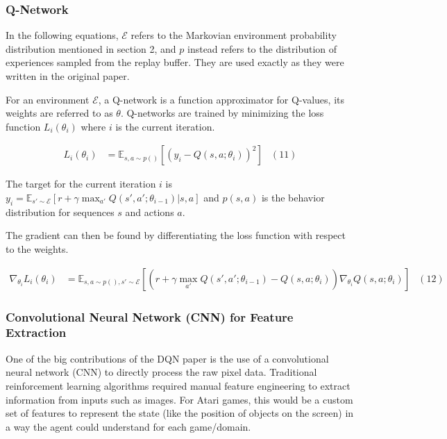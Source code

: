\documentclass{article}
\begin{document}
\subsubsection{Q-Network}

In the following equations, $\mathcal{E}$ refers to the Markovian environment probability distribution mentioned in section 2, and $p$ instead refers to the distribution of experiences sampled from the replay buffer. They are used exactly as they were written in the original paper.

For an environment $\mathcal{E}$, a Q-network is a function approximator for Q-values, its weights are referred to as $\theta$. 
Q-networks are trained by minimizing the loss function $L_{i}(\theta_{i})$ where $i$ is the current iteration.
 \vspace{-5mm}\begin{center}
    \begin{align*}
        L_{i}(\theta_{i}) &= \mathbb{E}_{s,a\sim p()}[(y_{i}-Q(s,a;\theta_{i}))^{2}] & (11)
    \end{align*}
 \end{center}

The target for the current iteration $i$ is $y_{i} = \mathbb{E}_{s'\sim \mathcal{E}} [r + \gamma \max_{a'}Q(s', a'; \theta_{i-1})|s, a]$ and $p(s, a)$ is the behavior distribution for sequences $s$ and actions $a$.


The gradient can then be found by differentiating the loss function with respect to the weights.


 \vspace{-5mm}\begin{center}
    \begin{align*}
        \nabla_{\theta_{i}} L_{i}(\theta_{i}) &= \mathbb{E}_{s,a\sim p(),s'\sim \mathcal{E}}[(r + \gamma \max_{a'}Q(s', a'; \theta_{i-1})-Q(s,a;\theta_{i}))\nabla_{\theta_{i}}Q(s,a;\theta_{i})] & (12)
    \end{align*}
 \end{center}

\subsubsection{Convolutional Neural Network (CNN) for Feature Extraction}

One of the big contributions of the DQN paper is the use of a convolutional neural network (CNN) to directly process the raw pixel data.
Traditional reinforcement learning algorithms required manual feature engineering to extract information from inputs such as images.
For Atari games, this would be a custom set of features to represent the state (like the position of objects on the screen) in a way the agent could understand for each game/domain.
\end{document}
